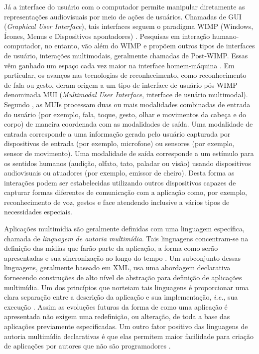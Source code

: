 Já a interface do usuário com o computador permite manipular diretamente as representações audiovisuais por meio de ações de usuários. Chamadas de GUI (\textit{Graphical User Interface}), tais interfaces seguem o paradigma WIMP (Windows, Ícones, Menus e Dispositivos apontadores) \cite{shneiderman2010designing,guedes2015specification, barnes1999graphical}. Pesquisas em interação humano-computador, no entanto, vão além do WIMP e propõem outros tipos de interfaces de usuário, interações multimodais, geralmente chamadas de Post-WIMP. Essas vêm ganhado um espaço cada vez maior na interface homem-máquina \cite{jalal2017iot, waltl2010increasing}. Em particular, os avanços nas tecnologias de reconhecimento, como reconhecimento de fala ou gesto, deram origem a um tipo de interface de usuário pós-WIMP denominada MUI (\textit{Multimodal User Interface}, interface de usuário multimodal). Segundo \cite{turk2014multimodal, kopp2006towards}, as MUIs processam duas ou mais modalidades combinadas de entrada do usuário (por exemplo, fala, toque, gesto, olhar e movimentos da cabeça e do corpo) de maneira coordenada com as modalidades de saída. Uma modalidade de entrada corresponde a uma informação gerada pelo usuário capturada por dispositivos de entrada (por exemplo, microfone) ou sensores (por exemplo, sensor de movimento). Uma modalidade de saída corresponde a um estímulo para os sentidos humanos (audição, olfato, tato, paladar ou visão) usando dispositivos audiovisuais ou atuadores (por exemplo, emissor de cheiro). Desta forma as interações podem ser estabelecidas utilizando outros dispositivos capazes de capturar formas diferentes de comunicação com a aplicação como, por exemplo, reconhecimento de voz, gestos e face atendendo inclusive a vários tipos de necessidades especiais.

Aplicações multimídia são geralmente definidas com uma linguagem específica, chamada de \emph{linguagem de autoria multimídia}. Tais linguagens concentram-se na definição das mídias que farão parte da aplicação, a forma como serão apresentadas e sua sincronização ao longo do tempo \cite{Blakowski:1996aa,Hardman:1998zj}. Um subconjunto dessas linguagens, geralmente baseado em XML, usa uma abordagem declarativa fornecendo construções de alto nível de abstração para definição de aplicações multimídia. Um dos princípios que norteiam tais linguagens é proporcionar uma clara separação entre a descrição da aplicação e sua implementação, \textit{i.e.}, sua execução \cite{Hardman:1998zj}. Assim as evoluções futuras da forma de como uma aplicação é apresentada não exigem uma redefinição, ou alteração, de toda a base das aplicações previamente especificadas. Um outro fator positivo das linguagens de autoria multimídia declarativas é que elas permitem maior facilidade para criação de aplicações por autores que não são programadores \cite{soares2009programando}. 

